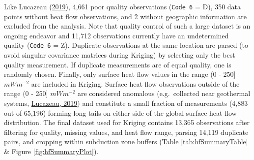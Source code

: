 Like Lucazeau (\protect\hyperlink{ref-lucazeau2019}{2019}), 4,661 poor quality observations (\texttt{Code\ 6} = D), 350 data points without heat flow observations, and 2 without geographic information are excluded from the analysis. Note that quality control of such a large dataset is an ongoing endeavor and 11,712 observations currently have an undetermined quality (\texttt{Code\ 6} = Z). Duplicate observations at the same location are parsed (to avoid singular covariance matrices during Kriging) by selecting only the best quality measurement. If duplicate measurements are of equal quality, one is randomly chosen. Finally, only surface heat flow values in the range (0 - 250{]} \(mWm^{-2}\) are included in Kriging. Surface heat flow observations outside of the range (0 - 250{]} \(mWm^{-2}\) are considered anomalous (e.g.~collected near geothermal systems, \protect\hyperlink{ref-lucazeau2019}{Lucazeau, 2019}) and constitute a small fraction of measurements (4,883 out of 65,196) forming long tails on either side of the global surface heat flow distribution. The final dataset used for Kriging contains 13,365 observations after filtering for quality, missing values, and heat flow range, parsing 14,119 duplicate pairs, and cropping within subduction zone buffers (Table \ref{tab:hfSummaryTable} \& Figure \ref{fig:hfSummaryPlot}).



